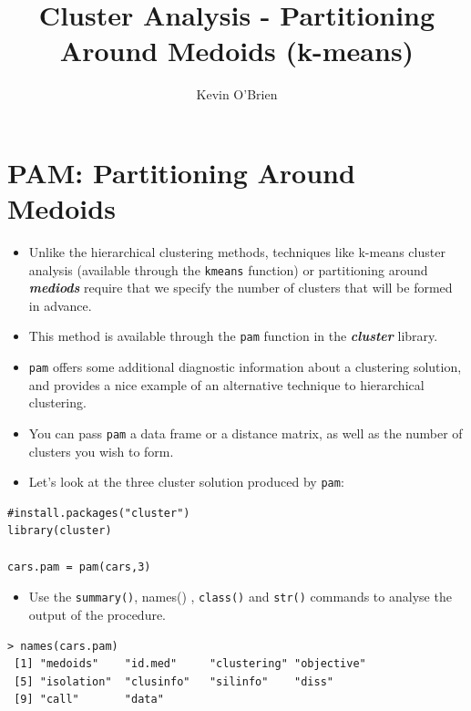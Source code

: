 \documentclass[12pt]{article}
\begin{document}
\author{Kevin O'Brien}
\title{Cluster Analysis - Partitioning Around Medoids (k-means)}

\newpage
\section*{PAM: Partitioning Around Medoids}
\begin{itemize}
\item Unlike the hierarchical clustering methods, techniques like k-means cluster analysis (available through the \texttt{kmeans} function) or partitioning around \textbf{\textit{mediods}}  require that we specify the number of clusters that will be formed in advance. 
\item This method is available through the \texttt{pam} function in the \textbf{\textit{cluster}} library.
\item \texttt{pam} offers some additional diagnostic information about a clustering solution, and provides a nice example of an alternative technique to hierarchical clustering. 
\item You can pass \texttt{pam} a data frame or a distance matrix, as well as the number of clusters you wish to form. 
\item Let's look at the three cluster solution produced by \texttt{pam}:
\end{itemize}
\begin{framed}
\begin{verbatim}
#install.packages("cluster")
library(cluster)

cars.pam = pam(cars,3)
\end{verbatim}
\end{framed}
\begin{itemize}
\item Use the \texttt{summary()}, names() , \texttt{class()} and \texttt{str()} commands to analyse the output of the procedure.
\end{itemize}


\begin{framed}
\begin{verbatim}
> names(cars.pam)
 [1] "medoids"    "id.med"     "clustering" "objective" 
 [5] "isolation"  "clusinfo"   "silinfo"    "diss"      
 [9] "call"       "data"
\end{verbatim}
\end{framed}
\end{document}
